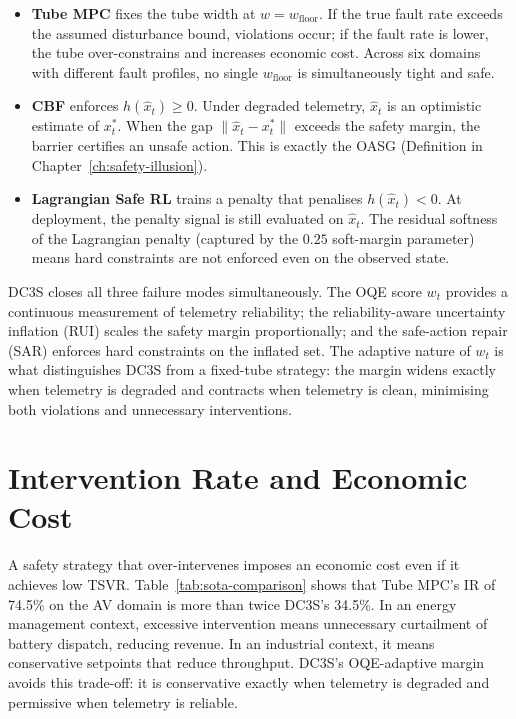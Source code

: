 \begin{itemize}
  \item \textbf{Tube MPC} fixes the tube width at $w = w_{\text{floor}}$.
    If the true fault rate exceeds the assumed disturbance bound, violations
    occur; if the fault rate is lower, the tube over-constrains and increases
    economic cost.  Across six domains with different fault profiles, no
    single $w_{\text{floor}}$ is simultaneously tight and safe.

  \item \textbf{CBF} enforces $h(\hat{x}_t) \ge 0$.  Under degraded
    telemetry, $\hat{x}_t$ is an optimistic estimate of $x_t^*$.  When the
    gap $\|\hat{x}_t - x_t^*\|$ exceeds the safety margin, the barrier
    certifies an unsafe action.  This is exactly the OASG (Definition in
    Chapter~\ref{ch:safety-illusion}).

  \item \textbf{Lagrangian Safe RL} trains a penalty that penalises
    $h(\hat{x}_t) < 0$.  At deployment, the penalty signal is still
    evaluated on $\hat{x}_t$.  The residual softness of the Lagrangian
    penalty (captured by the $0.25$ soft-margin parameter) means hard
    constraints are not enforced even on the observed state.
\end{itemize}

DC3S closes all three failure modes simultaneously.  The OQE score $w_t$
provides a continuous measurement of telemetry reliability; the
reliability-aware uncertainty inflation (RUI) scales the safety margin
proportionally; and the safe-action repair (SAR) enforces hard constraints
on the inflated set.  The adaptive nature of $w_t$ is what distinguishes
DC3S from a fixed-tube strategy: the margin widens exactly when telemetry is
degraded and contracts when telemetry is clean, minimising both violations
and unnecessary interventions.

\section{Intervention Rate and Economic Cost}

A safety strategy that over-intervenes imposes an economic cost even if it
achieves low TSVR.  Table~\ref{tab:sota-comparison} shows that Tube MPC's
IR of 74.5\% on the AV domain is more than twice DC3S's 34.5\%.  In an
energy management context, excessive intervention means unnecessary
curtailment of battery dispatch, reducing revenue.  In an industrial
context, it means conservative setpoints that reduce throughput.  DC3S's
OQE-adaptive margin avoids this trade-off: it is conservative exactly when
telemetry is degraded and permissive when telemetry is reliable.

